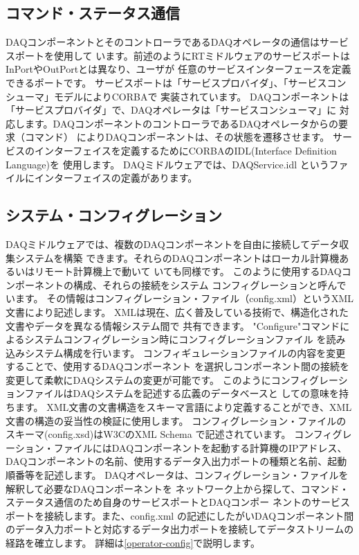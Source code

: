 \documentclass[a4j,10pt,dvips,onecolumn,oneside,final]{jarticle}%
\begin{document}
\subsection{コマンド・ステータス通信}\label{status}
DAQコンポーネントとそのコントローラであるDAQオペレータの通信はサービスポートを使用して
います。前述のようにRTミドルウェアのサービスポートはInPortやOutPortとは異なり、ユーザが
任意のサービスインターフェースを定義できるポートです。
サービスポートは「サービスプロバイダ」、「サービスコンシューマ」モデルによりCORBAで
実装されています。
DAQコンポーネントは「サービスプロバイダ」で、DAQオペレータは「サービスコンシューマ」に
対応します。DAQコンポーネントのコントローラであるDAQオペレータからの要求（コマンド）
によりDAQコンポーネントは、その状態を遷移させます。
サービスのインターフェイスを定義するためにCORBAのIDL(Interface Definition Language)を
使用します。
DAQミドルウェアでは、DAQService.idl というファイルにインターフェイスの定義があります。

\subsection{システム・コンフィグレーション}\label{config}
DAQミドルウェアでは、複数のDAQコンポーネントを自由に接続してデータ収集システムを構築
できます。それらのDAQコンポーネントはローカル計算機あるいはリモート計算機上で動いて
いても同様です。
このように使用するDAQコンポーネントの構成、それらの接続をシステム
コンフィグレーションと呼んでいます。
その情報はコンフィグレーション・ファイル（config.xml）というXML文書により記述します。
XMLは現在、広く普及している技術で、構造化された文書やデータを異なる情報システム間で
共有できます。
"Configure"コマンドによるシステムコンフィグレーション時にコンフィグレーションファイル
を読み込みシステム構成を行います。
コンフィギュレーションファイルの内容を変更することで、使用するDAQコンポーネント
を選択しコンポーネント間の接続を変更して柔軟にDAQシステムの変更が可能です。
このようにコンフィグレーションファイルはDAQシステムを記述する広義のデータベースと
しての意味を持ちます。
XML文書の文書構造をスキーマ言語により定義することができ、XML文書の構造の妥当性の検証に使用します。
コンフィグレーション・ファイルのスキーマ(config.xsd)はW3CのXML Schema で記述されています。
コンフィグレーション・ファイルにはDAQコンポーネントを起動する計算機のIPアドレス、
DAQコンポーネントの名前、使用するデータ入出力ポートの種類と名前、起動順番等を記述します。
DAQオペレータは、コンフィグレーション・ファイルを解釈して必要なDAQコンポーネントを
ネットワーク上から探して、コマンド・ステータス通信のため自身のサービスポートとDAQコンポー
ネントのサービスポートを接続します。また、config.xml の記述にしたがいDAQコンポーネント間
のデータ入力ポートと対応するデータ出力ポートを接続してデータストリームの経路を確立します。
詳細は\ref{operator-config}で説明します。
\end{document}
